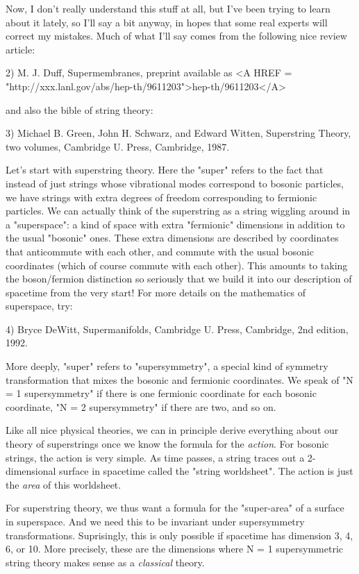 Now, I don't really understand this stuff at all, but I've been trying
to learn about it lately, so I'll say a bit anyway, in hopes that some
real experts will correct my mistakes.  Much of what I'll say comes from
the following nice review article:

2) M. J. Duff, Supermembranes, preprint available as <A HREF = "http://xxx.lanl.gov/abs/hep-th/9611203">hep-th/9611203</A>

and also the bible of string theory:

3)  Michael B. Green, John H. Schwarz, and Edward Witten, Superstring
Theory, two volumes, Cambridge U. Press, Cambridge, 1987.  

Let's start with superstring theory.  Here the "super" refers to the
fact that instead of just strings whose vibrational modes correspond to
bosonic particles, we have strings with extra degrees of freedom
corresponding to fermionic particles.  We can actually think of the
superstring as a string wiggling around in a "superspace": a kind of
space with extra "fermionic" dimensions in addition to the usual
"bosonic" ones.  These extra dimensions are described by coordinates
that anticommute with each other, and commute with the usual bosonic
coordinates (which of course commute with each other).  This amounts to
taking the boson/fermion distinction so seriously that we build it into
our description of spacetime from the very start!  For more details on
the mathematics of superspace, try:

4) Bryce DeWitt, Supermanifolds, Cambridge U. Press, Cambridge, 
2nd edition, 1992.

More deeply, "super" refers to "supersymmetry", a special kind of
symmetry transformation that mixes the bosonic and fermionic
coordinates.  We speak of "N = 1 supersymmetry" if there is one
fermionic coordinate for each bosonic coordinate, "N = 2 supersymmetry"
if there are two, and so on.  

Like all nice physical theories, we can in principle derive everything
about our theory of superstrings once we know the formula for the
\emph{action}.  For bosonic strings, the action is very simple.  As time
passes, a string traces out a 2-dimensional surface in spacetime called
the "string worldsheet".  The action is just the \emph{area} of this worldsheet.

For superstring theory, we thus want a formula for the "super-area" of a
surface in superspace.  And we need this to be invariant under
supersymmetry transformations.  Suprisingly, this is only possible if
spacetime has dimension 3, 4, 6, or 10.  More precisely, these are the
dimensions where N = 1 supersymmetric string theory makes sense as a
\emph{classical} theory.  

